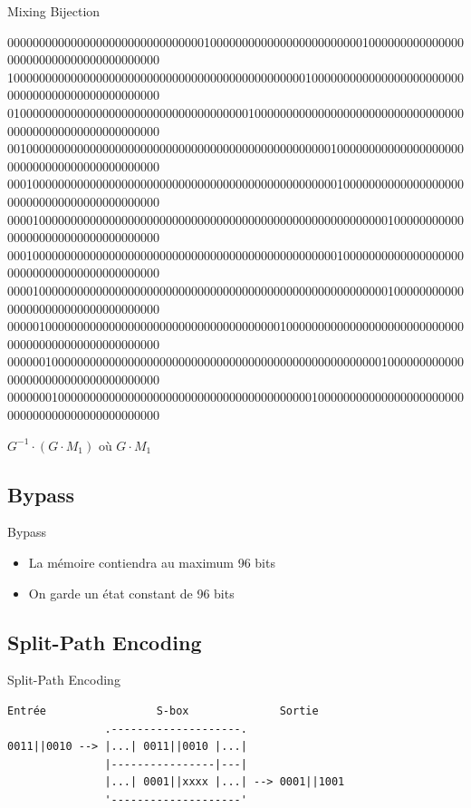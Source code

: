 \documentclass{beamer}
\begin{document}
\begin{frame}{Mixing Bijection}

\begin{center}

{\tiny
000000000000000000000000000000010000000000000000000000001000000000000000000000000000000000000000
100000000000000000000000000000000000000000000001000000000000000000000000000000000000000000000000
010000000000000000000000000000000000001000000000000000000000000000000000000000000000000000000000
001000000000000000000000000000000000000000000000000100000000000000000000000000000000000000000000
000100000000000000000000000000000000000000000000000010000000000000000000000000000000000000000000
000010000000000000000000000000000000000000000000000000000000100000000000000000000000000000000000
000100000000000000000000000000000000000000000000000010000000000000000000000000000000000000000000
000010000000000000000000000000000000000000000000000000000000100000000000000000000000000000000000
000001000000000000000000000000000000000000010000000000000000000000000000000000000000000000000000
000000100000000000000000000000000000000000000000000000000001000000000000000000000000000000000000
000000010000000000000000000000000000000000000000100000000000000000000000000000000000000000000000
}


$G^{-1} \cdot (G \cdot M_1)$ où $G \cdot M_1$
\end{center}

\end{frame}

\subsection{Bypass}

\begin{frame}{Bypass}
\begin{itemize}
\item La mémoire contiendra au maximum 96 bits
\item On garde un état constant de 96 bits
\end{itemize}
\end{frame}

\subsection{Split-Path Encoding}

\begin{frame}[fragile]{Split-Path Encoding}
\begin{Verbatim}[samepage=true]
    Entrée                 S-box              Sortie
               .--------------------.
0011||0010 --> |...| 0011||0010 |...|
               |----------------|---|
               |...| 0001||xxxx |...| --> 0001||1001
               '--------------------'
\end{Verbatim}
  
\end{frame}
\end{document}
